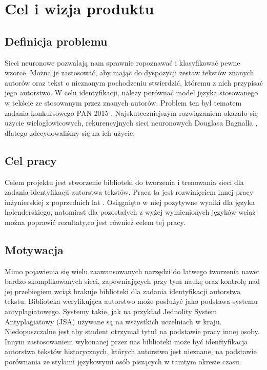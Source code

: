 \newpage
\section{Cel i wizja produktu}

\subsection{Definicja problemu}
Sieci neuronowe pozwalają nam sprawnie ropoznawać i klasyfikować pewne wzorce. Można je zastosować, aby
mając do dyspozycji zestaw tekstów znanych autorów oraz tekst o nieznanym pochodzeniu stwierdzić, któremu z nich 
przypisać jego autorstwo. W celu identyfikacji, należy porównać model języka stosowanego w tekście
ze stosowanym przez znanych autorów.
\newline
\newline
Problem ten był tematem zadania konkursowego PAN 2015 \cite{pan}.
Najskuteczniejszym rozwiązaniem okazało się użycie wielogłowicowych, rekurencyjnych sieci 
neuronowych Douglasa Bagnalla \cite{bagnall}, dlatego zdecydowaliśmy się na ich użycie.

 
\subsection{Cel pracy}
Celem projektu jest stworzenie biblioteki do tworzenia i trenowania sieci dla zadania 
identyfikacji autorstwa tekstów. Praca ta jest rozwinięciem innej pracy inżynierskiej z poprzednich lat \cite{radzio}.
Osiągnięto w niej pozytywne wyniki dla języka holenderskiego, natomiast dla pozostałych z wyżej wymienionych języków 
wciąż można poprawić rezultaty,co jest również celem tej pracy.


\subsection{Motywacja}
Mimo pojawienia się wielu zaawansowanych narzędzi do łatwego tworzenia nawet bardzo skomplikowanych sieci, 
zapewniających przy tym naukę oraz kontrolę nad jej przebiegiem wciąż brakuje biblioteki dla zadania identyfikacji autorstwa 
tekstu.
Biblioteka weryfikująca autorstwo może posłużyć jako podstawa systemu antyplagiatowego. Systemy takie, 
jak na przykład Jednolity System Antyplagiatowy (JSA) używane są na wszystkich uczelniach w kraju.
Niedopuszczalne jest aby student otrzymał tytuł na podstawie pracy innej osoby. Innym zastosowaniem
wykonanej przez nas biblioteki może być idenftyfikacja autorstwa tekstów historycznych, których autorstwo jest
nieznane, na podstawie porównania ze stylami językowymi osób piszących w tamtym okresie czasu.

